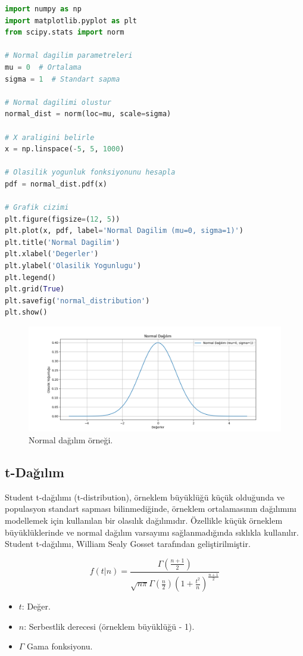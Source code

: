 \begin{lstlisting}[language=Python]
import numpy as np
import matplotlib.pyplot as plt
from scipy.stats import norm

# Normal dagilim parametreleri
mu = 0  # Ortalama
sigma = 1  # Standart sapma

# Normal dagilimi olustur
normal_dist = norm(loc=mu, scale=sigma)

# X araligini belirle
x = np.linspace(-5, 5, 1000)

# Olasilik yogunluk fonksiyonunu hesapla
pdf = normal_dist.pdf(x)

# Grafik cizimi
plt.figure(figsize=(12, 5))
plt.plot(x, pdf, label='Normal Dagilim (mu=0, sigma=1)')
plt.title('Normal Dagilim')
plt.xlabel('Degerler')
plt.ylabel('Olasilik Yogunlugu')
plt.legend()
plt.grid(True)
plt.savefig('normal_distribution')
plt.show()
\end{lstlisting}

\begin{figure}[h]
    \centering
    \includegraphics[width=1\textwidth]{images/normal_distribution.png}
    \caption{Normal dağılım örneği.}
    \label{fig:enter-label}
\end{figure}

\subsection{t-Dağılım}
Student t-dağılımı (t-distribution), örneklem büyüklüğü küçük olduğunda ve populasyon standart sapması bilinmediğinde, örneklem ortalamasının dağılımını modellemek için kullanılan bir olasılık dağılımıdır. Özellikle küçük örneklem büyüklüklerinde ve normal dağılım varsayımı sağlanmadığında sıklıkla kullanılır. Student t-dağılımı, William Sealy Gosset tarafından geliştirilmiştir.

\[f(t|n) = \frac{\Gamma\left(\frac{n+1}{2}\right)}{\sqrt{n\pi}\Gamma\left(\frac{n}{2}\right)\left(1+\frac{t^2}{n}\right)^{\frac{n+1}{2}}}\]
\begin{itemize}
	\item $t$: Değer.
	\item $n$: Serbestlik derecesi (örneklem büyüklüğü - 1).
	\item $\Gamma$ Gama fonksiyonu.
\end{itemize}

